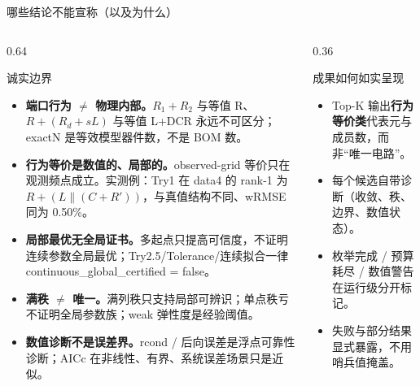\documentclass[UTF8,aspectratio=169,10pt]{ctexbeamer}
\begin{document}
\begin{frame}{哪些结论不能宣称（以及为什么）}
  \begin{columns}
    \begin{column}{0.64\textwidth}
      \begin{alertblock}{诚实边界}
        \begin{itemize}
          \item \textbf{端口行为 $\ne$ 物理内部。}$R_1{+}R_2$ 与等值 R、$R{+}(R_d{+}sL)$ 与等值 L+DCR 永远不可区分；exactN 是等效模型器件数，不是 BOM 数。
          \item \textbf{行为等价是数值的、局部的。}observed-grid 等价只在观测频点成立。实测例：Try1 在 data4 的 rank-1 为 $R{+}(L\parallel(C{+}R'))$，与真值结构不同、wRMSE 同为 0.50\%。
          \item \textbf{局部最优无全局证书。}多起点只提高可信度，不证明连续参数全局最优；Try2.5/Tolerance/连续拟合一律 continuous\_global\_certified = false。
          \item \textbf{满秩 $\ne$ 唯一。}满列秩只支持局部可辨识；单点秩亏不证明全局参数族；weak 弹性度是经验阈值。
          \item \textbf{数值诊断不是误差界。}rcond / 后向误差是浮点可靠性诊断；AICc 在非线性、有界、系统误差场景只是近似。
        \end{itemize}
      \end{alertblock}
    \end{column}
    \begin{column}{0.36\textwidth}
      \begin{block}{成果如何如实呈现}
        \begin{itemize}
          \item Top-K 输出\textbf{行为等价类}代表元与成员数，而非“唯一电路”。
          \item 每个候选自带诊断（收敛、秩、边界、数值状态）。
          \item 枚举完成 / 预算耗尽 / 数值警告在运行级分开标记。
          \item 失败与部分结果显式暴露，不用哨兵值掩盖。
        \end{itemize}
      \end{block}
    \end{column}
  \end{columns}
\end{frame}
\end{document}
